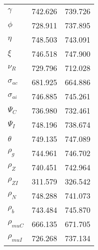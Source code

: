 \begin{center}
\begin{longtable}{lcc}
$ \gamma                  $	 & 	     742.626	 & 	     739.726 \\ 
$ {\phi}                  $	 & 	     728.911	 & 	     737.895 \\ 
$ {\eta}                  $	 & 	     748.503	 & 	     743.091 \\ 
$ \xi                     $	 & 	     746.518	 & 	     747.900 \\ 
$ {\nu_R}                 $	 & 	     729.796	 & 	     712.028 \\ 
$ {\sigma_{ac}}           $	 & 	     681.925	 & 	     664.886 \\ 
$ {\sigma_{ai}}           $	 & 	     746.885	 & 	     745.261 \\ 
$ {\Psi_{C}}              $	 & 	     736.980	 & 	     732.461 \\ 
$ {\Psi_I}                $	 & 	     748.196	 & 	     738.674 \\ 
$ {\theta}                $	 & 	     749.135	 & 	     747.089 \\ 
$ {\rho_g}                $	 & 	     744.961	 & 	     746.702 \\ 
$ {\rho_Z}                $	 & 	     740.451	 & 	     742.964 \\ 
$ {\rho_{ZI}}             $	 & 	     311.579	 & 	     326.542 \\ 
$ {\rho_N}                $	 & 	     748.288	 & 	     741.073 \\ 
$ {\rho_b}                $	 & 	     743.484	 & 	     745.870 \\ 
$ {\rho_{muC}}            $	 & 	     666.135	 & 	     671.705 \\ 
$ {\rho_{muI}}            $	 & 	     726.268	 & 	     737.134 \\ 
\end{longtable}
 \end{center}

